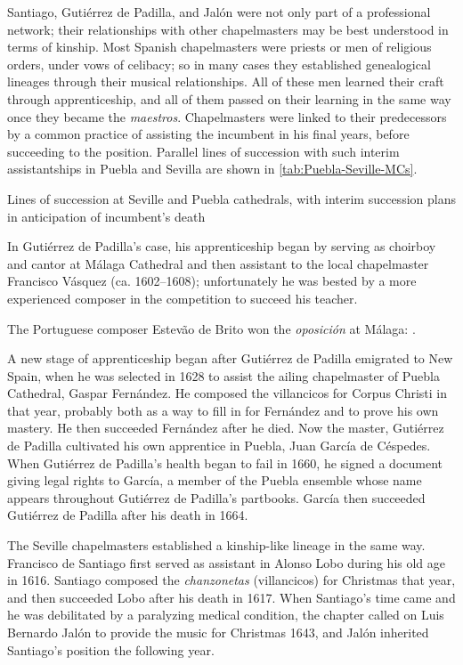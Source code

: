 Santiago, Gutiérrez de Padilla, and Jalón were not only part of a professional
network; their relationships with other chapelmasters may be best understood in
terms of kinship.
Most Spanish chapelmasters were priests or men of religious orders, under vows
of celibacy; so in many cases they established genealogical lineages through
their musical relationships.
All of these men learned their craft through apprenticeship, and all of them
passed on their learning in the same way once they became the \emph{maestros}.
Chapelmasters were linked to their predecessors by a common practice of
assisting the incumbent in his final years, before succeeding to the position.
Parallel lines of succession with such interim assistantships in Puebla and
Sevilla are shown in \cref{tab:Puebla-Seville-MCs}.

{Lines of succession at Seville and Puebla cathedrals, with interim succession
plans in anticipation of incumbent's death}

In Gutiérrez de Padilla's case, his apprenticeship began by serving as choirboy
and cantor at Málaga Cathedral and then assistant to the local chapelmaster
Francisco Vásquez (ca. 1602--1608); unfortunately he was bested by a more
experienced composer in the competition to succeed his teacher.%
\begin{Footnote}
    The Portuguese composer Estevão de Brito won the \emph{oposición} at
    Málaga: \autocites{Gembero:Padilla}{Stevenson:BritoE}.
\end{Footnote}
A new stage of apprenticeship began after Gutiérrez de Padilla emigrated to New
Spain, when he was selected in 1628 to assist the ailing chapelmaster of Puebla
Cathedral, Gaspar Fernández.%
    \Autocite{Morales:Fernandez}
He composed the villancicos for Corpus Christi in that year, probably both as a
way to fill in for Fernández and to prove his own mastery.%
    \Autocite{Cashner:Cards}
He then succeeded Fernández after he died.
Now the master, Gutiérrez de Padilla cultivated his own apprentice in Puebla,
Juan García de Céspedes.
When Gutiérrez de Padilla's health began to fail in 1660, he signed a
 document giving legal rights to García, a member of
the Puebla ensemble whose name appears throughout Gutiérrez de Padilla's
partbooks.  
García then succeeded Gutiérrez de Padilla after his death in 1664.%
    \Autocite[237--238]{Mauleon:PadillaCivil}

The Seville chapelmasters established a kinship-like lineage in the same way.
Francisco de Santiago first served as assistant in Alonso Lobo during his old
age in 1616.%
    \Autocite{Stevenson:SantiagoF}
Santiago composed the \emph{chanzonetas} (villancicos) for Christmas that year,
and then succeeded Lobo after his death in 1617.
When Santiago's time came and he was debilitated by a paralyzing medical
condition, the chapter called on Luis Bernardo Jalón to provide the music for
Christmas 1643, and Jalón inherited Santiago's position the following year.

